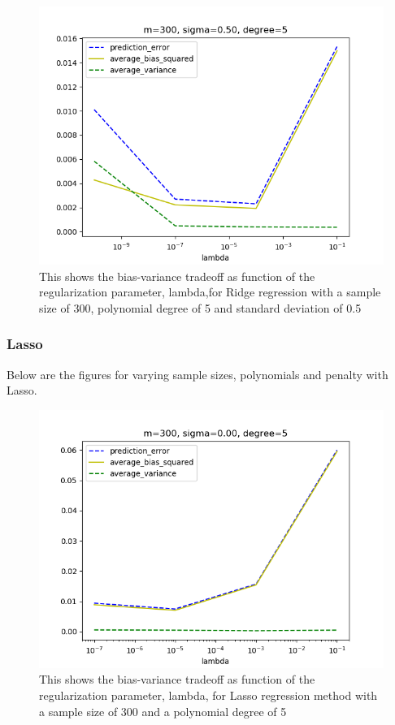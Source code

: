 \medskip

\FloatBarrier
\begin{figure}[!ht]
	\centering
	\FloatBarrier
	\includegraphics[width=1\textwidth]{plot_ridge_without_r2/ridgeprediction_error_m300_d5_s50.png}
	
	\caption{This shows the bias-variance tradeoff as function of the regularization parameter, lambda,for Ridge regression with a sample size of 300, polynomial degree of 5 and standard deviation of 0.5}
	\label{fig:2}
\end{figure}
\FloatBarrier

\medskip



\subsubsection{Lasso}
Below are the figures for varying sample sizes, polynomials and penalty with Lasso.
\FloatBarrier
\begin{figure}[!ht]
	\centering
	\FloatBarrier
	\includegraphics[width=1\textwidth]{plot_lasso_without_r2/lassoprediction_error_m300_d5_s0.png}
	
	\caption{This shows the bias-variance tradeoff as function of the regularization parameter, lambda, for Lasso regression method with a sample size of 300 and a polynomial degree of 5}
	\label{fig:3}
\end{figure}
\FloatBarrier

